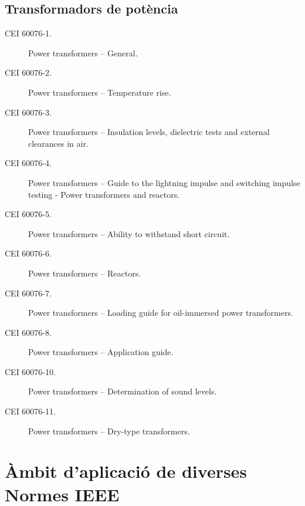 \subsection*{Transformadors de potència}
\begin{description}
    \item [\hspace{5mm}CEI 60076-1.] Power transformers -- General.
    \item [\hspace{5mm}CEI 60076-2.] Power transformers -- Temperature rise.
    \item [\hspace{5mm}CEI 60076-3.] Power transformers -- Insulation levels, dielectric tests and external clearances in air.
    \item [\hspace{5mm}CEI 60076-4.] Power transformers -- Guide to the lightning impulse and switching impulse testing - Power transformers and reactors.
    \item [\hspace{5mm}CEI 60076-5.] Power transformers -- Ability to withstand short circuit.
    \item [\hspace{5mm}CEI 60076-6.] Power transformers -- Reactors.
    \item [\hspace{5mm}CEI 60076-7.] Power transformers -- Loading guide for oil-immersed power transformers.
    \item [\hspace{5mm}CEI 60076-8.] Power transformers -- Application guide.
    \item [\hspace{5mm}CEI 60076-10.] Power transformers -- Determination of sound levels.
    \item [\hspace{5mm}CEI 60076-11.] Power transformers -- Dry-type transformers.
\end{description}


\section{Àmbit d'aplicació de diverses Normes IEEE}\label{sec:normes_IEEE}

